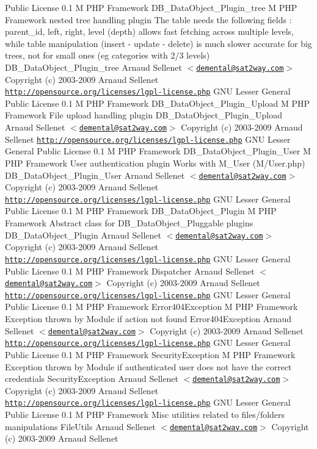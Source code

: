 \begin{Desc}
Public License  0.1  M PHP Framework   DB\_\-DataObject\_\-Plugin\_\-tree  M PHP Framework  nested tree handling plugin The table needs the following fields : parent\_\-id, left, right, level (depth) allows fast fetching across multiple levels, while table manipulation (insert - update - delete) is much slower accurate for big trees, not for small ones (eg categories with 2/3 levels)   DB\_\-DataObject\_\-Plugin\_\-tree  Arnaud Sellenet $<$\href{mailto:demental@sat2way.com}{\tt demental@sat2way.com}$>$  Copyright (c) 2003-2009 Arnaud Sellenet  \href{http://opensource.org/licenses/lgpl-license.php}{\tt http://opensource.org/licenses/lgpl-license.php} GNU Lesser General Public License  0.1  M PHP Framework   DB\_\-DataObject\_\-Plugin\_\-Upload  M PHP Framework  File upload handling plugin   DB\_\-DataObject\_\-Plugin\_\-Upload  Arnaud Sellenet $<$\href{mailto:demental@sat2way.com}{\tt demental@sat2way.com}$>$  Copyright (c) 2003-2009 Arnaud Sellenet  \href{http://opensource.org/licenses/lgpl-license.php}{\tt http://opensource.org/licenses/lgpl-license.php} GNU Lesser General Public License  0.1  M PHP Framework   DB\_\-DataObject\_\-Plugin\_\-User  M PHP Framework  User authentication plugin Works with M\_\-User (M/User.php)   DB\_\-DataObject\_\-Plugin\_\-User  Arnaud Sellenet $<$\href{mailto:demental@sat2way.com}{\tt demental@sat2way.com}$>$  Copyright (c) 2003-2009 Arnaud Sellenet  \href{http://opensource.org/licenses/lgpl-license.php}{\tt http://opensource.org/licenses/lgpl-license.php} GNU Lesser General Public License  0.1  M PHP Framework   DB\_\-DataObject\_\-Plugin  M PHP Framework  Abstract class for DB\_\-DataObject\_\-Pluggable plugins   DB\_\-DataObject\_\-Plugin  Arnaud Sellenet $<$\href{mailto:demental@sat2way.com}{\tt demental@sat2way.com}$>$  Copyright (c) 2003-2009 Arnaud Sellenet  \href{http://opensource.org/licenses/lgpl-license.php}{\tt http://opensource.org/licenses/lgpl-license.php} GNU Lesser General Public License  0.1  M PHP Framework   Dispatcher  Arnaud Sellenet $<$\href{mailto:demental@sat2way.com}{\tt demental@sat2way.com}$>$  Copyright (c) 2003-2009 Arnaud Sellenet  \href{http://opensource.org/licenses/lgpl-license.php}{\tt http://opensource.org/licenses/lgpl-license.php} GNU Lesser General Public License  0.1  M PHP Framework   Error404Exception  M PHP Framework  Exception thrown by Module if action not found   Error404Exception  Arnaud Sellenet $<$\href{mailto:demental@sat2way.com}{\tt demental@sat2way.com}$>$  Copyright (c) 2003-2009 Arnaud Sellenet  \href{http://opensource.org/licenses/lgpl-license.php}{\tt http://opensource.org/licenses/lgpl-license.php} GNU Lesser General Public License  0.1  M PHP Framework   SecurityException  M PHP Framework  Exception thrown by Module if authenticated user does not have the correct credentials   SecurityException  Arnaud Sellenet $<$\href{mailto:demental@sat2way.com}{\tt demental@sat2way.com}$>$  Copyright (c) 2003-2009 Arnaud Sellenet  \href{http://opensource.org/licenses/lgpl-license.php}{\tt http://opensource.org/licenses/lgpl-license.php} GNU Lesser General Public License  0.1  M PHP Framework  Misc utilities related to files/folders manipulations   FileUtils  Arnaud Sellenet $<$\href{mailto:demental@sat2way.com}{\tt demental@sat2way.com}$>$  Copyright (c) 2003-2009 Arnaud Sellenet  
\end{Desc}
